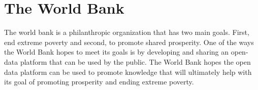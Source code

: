 \section{The World Bank}

The world bank is a philanthropic organization that has two main goals.  First,
end extreme poverty and second, to promote shared prosperity.  One of the ways
the World Bank hopes to meet its goals is by developing and sharing an
open-data platform that can be used by the public.  The World Bank hopes the
open data platform can be used to promote knowledge that will ultimately help
with its goal of promoting prosperity and ending extreme poverty\cite{hid-sp18-505-Bank2018}.
